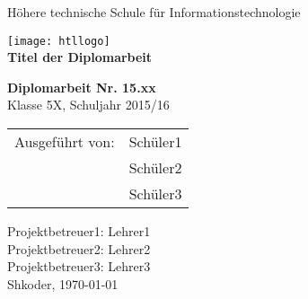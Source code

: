 
\newcommand{\trtitle}{Titel der Diplomarbeit}
\newcommand{\trort}{Shkoder}
\newcommand{\trbetreuer}{Titel Betreuer}
\newcommand{\trdate}{\today}
\newcommand{\trnumber}{15.xx}
\newcommand{\trclass}{5X}
\newcommand{\trschuelereins}{Sch\"uler1}
\newcommand{\trschuelerzwei}{Sch\"uler2}
\newcommand{\trschuelerdrei}{Sch\"uler3}
\newcommand{\trsauftraggeber}{Herr Max Mustermann oder Firma}
\newcommand{\trbetreuereins}{Lehrer1}
\newcommand{\trbetreuerzwei}{Lehrer2}
\newcommand{\trbetreuerdrei}{Lehrer3}

\thispagestyle{empty}

\begin{center}
  \Large H\"ohere technische Schule f\"ur Informationstechnologie
\end{center}

\begin{center}
  \texttt{[image: htllogo]} \\
  \textbf{\LARGE \trtitle}
\end{center}
\vspace{1cm}

\begin{flushleft}
\textbf{\LARGE Diplomarbeit Nr. \trnumber} \\
\LARGE Klasse \trclass{}, Schuljahr 2015/16

\begin{table}[htbp]
\Large
\begin{tabular}{cc}
   Ausgef\"uhrt von: & \trschuelereins \\ 
   & \trschuelerzwei \\ 
   & \trschuelerdrei \\ 
 \end{tabular}
\end{table}
\end{flushleft}


\large Projektbetreuer1: \trbetreuereins \\
\large Projektbetreuer2: \trbetreuerzwei \\
\large Projektbetreuer3: \trbetreuerdrei \\
\newline
\large \trort{}, \today

\vfill